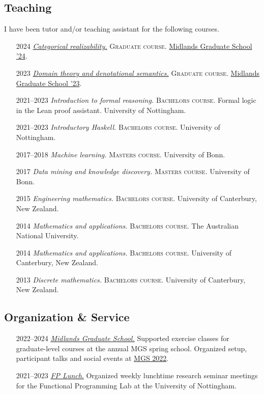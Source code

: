 \documentclass[12pt,a4paper]{article}
\providecommand{\tightlist}{%
  \setlength{\itemsep}{0pt}\setlength{\parskip}{0pt}}
\begin{document}
\subsection{Teaching}

I have been tutor and/or teaching assistant for the following courses.

\begin{itemize}[leftmargin=7ex]
\tightlist
\item[2024]
  \emph{\href{https://github.com/tomdjong/MGS-categorical-realizability}{Categorical realizability.}}
  \textsc{Graduate course.}
  \href{https://www.cs.le.ac.uk/events/mgs2024/}{Midlands Graduate School '24}.
\item[2023]
  \emph{\href{https://github.com/tomdjong/MGS-domain-theory}{Domain theory and denotational semantics.}}
  \textsc{Graduate course.}
  \href{https://www.cs.bham.ac.uk/~mhe/events/MGS23}{Midlands Graduate School '23}.
\item[\small 2021--2023]
  \emph{Introduction to formal reasoning.}
  \textsc{Bachelors course.}
  Formal logic in the Lean proof assistant.
  University of Nottingham.
\item[\small 2021--2023]
  \emph{Introductory Haskell.}
  \textsc{Bachelors course.}
  University of Nottingham.
\item[\small 2017--2018]
  \emph{Machine learning.}
  \textsc{Masters course.}
  University of Bonn.
\item[2017]
  \emph{Data mining and knowledge discovery.}
  \textsc{Masters course.}
  University of Bonn.
\item[2015]
  \emph{Engineering mathematics.}
  \textsc{Bachelors course.}
  University of Canterbury, New Zealand.
\item[2014]
  \emph{Mathematics and applications.}
  \textsc{Bachelors course.}
  The Australian National University.
\item[2014]
  \emph{Mathematics and applications.}
  \textsc{Bachelors course.}
  University of Canterbury, New Zealand.
\item[2013]
  \emph{Discrete mathematics.}
  \textsc{Bachelors course.}
  University of Canterbury, New Zealand.
\end{itemize}

\subsection{Organization \& Service}

\begin{itemize}[leftmargin=7ex]
\item[\small 2022--2024]
  \href{http://www.cs.nott.ac.uk/MGS}{\emph{Midlands Graduate School.}}
  Supported exercise classes for graduate-level courses at the annual MGS spring school.
  Organized setup, participant talks and social events at \href{https://www.cs.nott.ac.uk/~psznk/events/mgs22.html}{MGS 2022}.
\item[\small 2021--2023]
  \href{https://www.nottingham.ac.uk/research/groups/fp-lab/fp-lunch/fp-lunch.aspx}{\emph{FP Lunch}.}
  Organized weekly lunchtime research seminar meetings for the Functional Programming Lab at the University of Nottingham.
\end{itemize}
\end{document}
